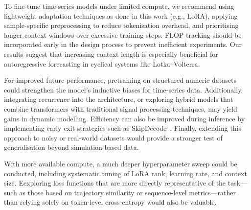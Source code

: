 \documentclass[a4paper,12pt]{article}
\begin{document}
  To fine-tune time-series models under limited compute, we recommend using lightweight adaptation techniques as done in this work (e.g., LoRA), applying sample-specific preprocessing to reduce tokenisation overhead, and prioritising longer context windows over excessive training steps. FLOP tracking should be incorporated early in the design process to prevent inefficient experiments. Our results suggest that increasing context length is especially beneficial for autoregressive forecasting in cyclical systems like Lotka–Volterra.
  
  For improved future performance, pretraining on structured numeric datasets could strengthen the model’s inductive biases for time-series data. Additionally, integrating recurrence into the architecture, or exploring hybrid models that combine transformers with traditional signal processing techniques, may yield gains in dynamic modelling. Efficiency can also be improved during inference by implementing early exit strategies such as SkipDecode~\cite{delcorro2023skipdecode}. Finally, extending this approach to noisy or real-world datasets would provide a stronger test of generalisation beyond simulation-based data.
  
  With more available compute, a much deeper hyperparameter sweep could be conducted, including systematic tuning of LoRA rank, learning rate, and context size. Eexploring loss functions that are more directly representative of the task—such as those based on trajectory similarity or sequence-level metrics—rather than relying solely on token-level cross-entropy would also be valuable.
  
\end{document}
